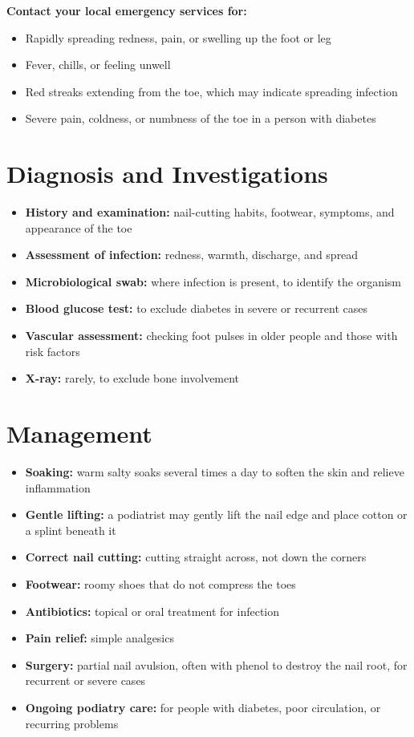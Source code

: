 \textbf{Contact your local emergency services for:}
\begin{itemize}
    \item Rapidly spreading redness, pain, or swelling up the foot or leg
    \item Fever, chills, or feeling unwell
    \item Red streaks extending from the toe, which may indicate spreading infection
    \item Severe pain, coldness, or numbness of the toe in a person with diabetes
\end{itemize}

\section*{Diagnosis and Investigations}
\begin{itemize}
    \item \textbf{History and examination:} nail-cutting habits, footwear, symptoms, and appearance of the toe
    \item \textbf{Assessment of infection:} redness, warmth, discharge, and spread
    \item \textbf{Microbiological swab:} where infection is present, to identify the organism
    \item \textbf{Blood glucose test:} to exclude diabetes in severe or recurrent cases
    \item \textbf{Vascular assessment:} checking foot pulses in older people and those with risk factors
    \item \textbf{X-ray:} rarely, to exclude bone involvement
\end{itemize}

\section*{Management}
\begin{itemize}
    \item \textbf{Soaking:} warm salty soaks several times a day to soften the skin and relieve inflammation
    \item \textbf{Gentle lifting:} a podiatrist may gently lift the nail edge and place cotton or a splint beneath it
    \item \textbf{Correct nail cutting:} cutting straight across, not down the corners
    \item \textbf{Footwear:} roomy shoes that do not compress the toes
    \item \textbf{Antibiotics:} topical or oral treatment for infection
    \item \textbf{Pain relief:} simple analgesics
    \item \textbf{Surgery:} partial nail avulsion, often with phenol to destroy the nail root, for recurrent or severe cases
    \item \textbf{Ongoing podiatry care:} for people with diabetes, poor circulation, or recurring problems
\end{itemize}

